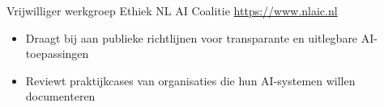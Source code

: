 \documentclass[a4paper, serif, 10pt]{moderncv}
\begin{document}
        {Vrijwilliger werkgroep Ethiek}
        {NL AI Coalitie}
        {\url{https://www.nlaic.nl}}
        {}
        {\begin{itemize}
\item Draagt bij aan publieke richtlijnen voor transparante en uitlegbare AI-toepassingen
\item Reviewt praktijkcases van organisaties die hun AI-systemen willen documenteren
\end{itemize}}
    
\end{document}
